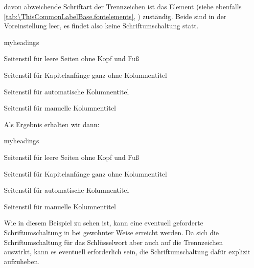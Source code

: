 davon abweichende Schriftart der Trennzeichen ist das Element
 (siehe
ebenfalls \autoref{tab:\ThisCommonLabelBase.fontelements},
) zuständig. Beide sind in
der Voreinstellung leer, es findet also keine
Schriftumschaltung statt.%
  \begin{Example}
\begin{lstcode}
  \begin{labeling}[~--]{myheadings}
    \item[empty] 
      Seitenstil für leere Seiten ohne Kopf und Fuß
    \item[plain] 
      Seitenstil für Kapitelanfänge ganz ohne 
      Kolumnentitel
    \item[headings] 
      Seitenstil für automatische Kolumnentitel
    \item[myheadings]
      Seitenstil für manuelle Kolumnentitel
  \end{labeling}
\end{lstcode}
    Als Ergebnis erhalten wir dann:
    \begin{ShowOutput}
      \begin{labeling}[~--]{myheadings}
      \item[empty] 
        Seitenstil für leere Seiten ohne Kopf und Fuß
      \item[plain] 
        Seitenstil für Kapitelanfänge ganz ohne 
        Kolumnentitel
      \item[headings] 
        Seitenstil für automatische Kolumnentitel
      \item[myheadings]
        Seitenstil für manuelle Kolumnentitel
      \end{labeling}
    \end{ShowOutput}
    Wie in diesem Beispiel zu sehen ist, kann eine eventuell geforderte
    Schriftumschaltung in bei \KOMAScript{} gewohnter Weise erreicht
    werden. Da sich die Schriftumschaltung für das Schlüsselwort aber auch auf
    die Trennzeichen auswirkt, kann es eventuell erforderlich sein, die
    Schriftumschaltung dafür explizit aufzuheben.
  \end{Example}
